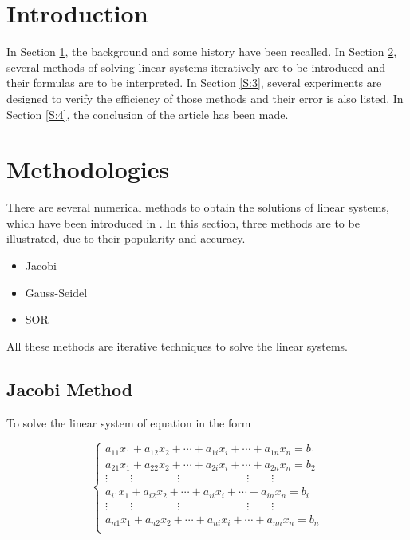 \documentclass[preprint,12pt]{elsarticle}
\begin{document}
\section{Introduction}
\label{S:1}

In Section \ref{S:1}, the background and some history  have been recalled. In Section \ref{S:2}, several methods of solving linear systems iteratively are to be introduced and their formulas are to be interpreted. In Section \ref{S:3}, several experiments are designed to verify the efficiency of those methods and their error is also listed. In Section \ref{S:4}, the conclusion of the article has been made.

\section{Methodologies}
\label{S:2}

There are several numerical methods to obtain the solutions of linear systems, which have been introduced in \cite{burden:2001na}. In this section, three methods are to be illustrated, due to their popularity and accuracy.

\begin{itemize}
\item Jacobi
\item Gauss-Seidel
\item SOR
\end{itemize}

All these methods are iterative techniques to solve the linear systems.

\subsection{Jacobi Method}
\label{SS:2.1}

To solve the linear system of equation in the form

\[
\left \{%
\begin{array}{ll}
a_{11}x_1+a_{12}x_2+\cdots+a_{1i}x_i+\cdots+a_{1n}x_n=b_1\\
a_{21}x_1+a_{22}x_2+\cdots+a_{2i}x_i+\cdots+a_{2n}x_n=b_2\\
\vdots \qquad \vdots \qquad \qquad  \vdots \qquad \qquad \qquad  \vdots \qquad  \vdots\\
a_{i1}x_1+a_{i2}x_2+\cdots+a_{ii}x_i+\cdots+a_{in}x_n=b_i\\
\vdots \qquad \vdots \qquad \qquad  \vdots \qquad \qquad \qquad  \vdots \qquad  \vdots\\
a_{n1}x_1+a_{n2}x_2+\cdots+a_{ni}x_i+\cdots+a_{nn}x_n=b_n\\
\end{array}
\right.
\]
\end{document}
